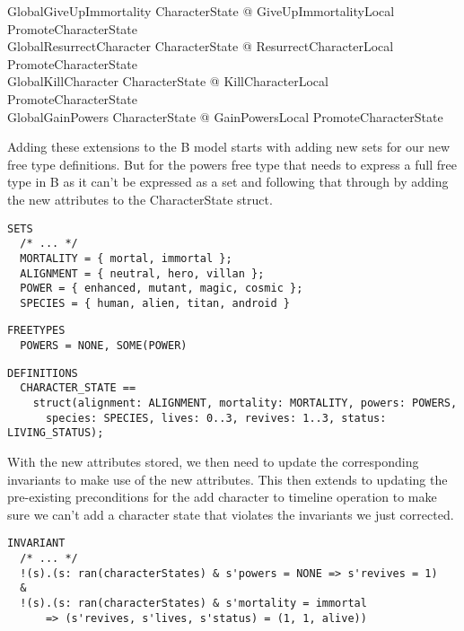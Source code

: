\documentclass{article}
\begin{document}
\begin{zed}
GlobalGiveUpImmortality  \exists \Delta CharacterState @ GiveUpImmortalityLocal \land PromoteCharacterState \\
GlobalResurrectCharacter  \exists \Delta CharacterState @ ResurrectCharacterLocal \land PromoteCharacterState \\
GlobalKillCharacter  \exists \Delta CharacterState @ KillCharacterLocal \land PromoteCharacterState \\ 
GlobalGainPowers  \exists \Delta CharacterState @ GainPowersLocal \land PromoteCharacterState \\
\end{zed}

\hspace{-0.64cm} Adding these extensions to the B model starts with adding new sets for our new free type definitions. But for the powers free type that needs to express a full free type in B as it can’t be expressed as a set and following that through by adding the new attributes to the CharacterState struct.

\begin{verbatim}
SETS 
  /* ... */
  MORTALITY = { mortal, immortal };
  ALIGNMENT = { neutral, hero, villan };
  POWER = { enhanced, mutant, magic, cosmic };
  SPECIES = { human, alien, titan, android }
\end{verbatim}
\begin{verbatim}
FREETYPES
  POWERS = NONE, SOME(POWER)
\end{verbatim}
\begin{verbatim}
DEFINITIONS
  CHARACTER_STATE == 
    struct(alignment: ALIGNMENT, mortality: MORTALITY, powers: POWERS, 
      species: SPECIES, lives: 0..3, revives: 1..3, status: LIVING_STATUS);
\end{verbatim}

\hspace{-0.64cm} With the new attributes stored, we then need to update the corresponding invariants to make use of the new attributes. This then extends to updating the pre-existing preconditions for the add character to timeline operation to make sure we can’t add a character state that violates the invariants we just corrected.

\begin{verbatim}
INVARIANT
  /* ... */
  !(s).(s: ran(characterStates) & s'powers = NONE => s'revives = 1)
  &
  !(s).(s: ran(characterStates) & s'mortality = immortal 
      => (s'revives, s'lives, s'status) = (1, 1, alive))
\end{verbatim}
\end{document}
